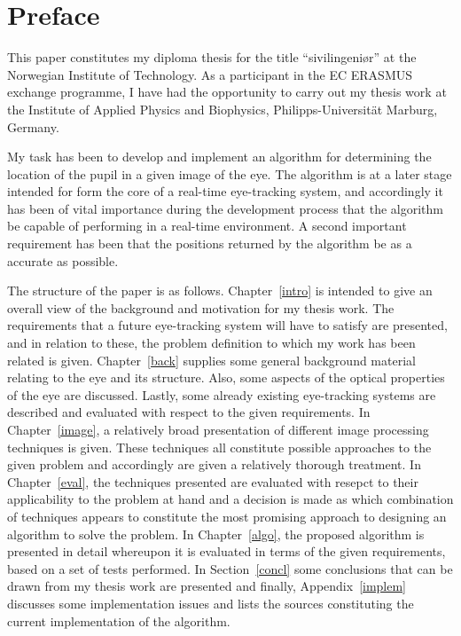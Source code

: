 
\cleardoublepage
\chapter*{Preface}
\label{preface}

This paper constitutes my diploma thesis for the title
``sivilingeni\o r'' at the Norwegian Institute of Technology.  As a
participant in the EC ERASMUS exchange programme, I have had the
opportunity to carry out my thesis work at the Institute of Applied
Physics and Biophysics, Philipps-Universit{\"a}t Marburg, Germany.

My task has been to develop and implement an algorithm for determining
the location of the pupil in a given image of the eye.  The algorithm
is at a later stage intended for form the core of a real-time
eye-tracking system, and accordingly it has been of vital importance
during the development process that the algorithm be capable of
performing in a real-time environment.  A second important requirement
has been that the positions returned by the algorithm be as a accurate
as possible.

The structure of the paper is as follows.  Chapter~\ref{intro} is
intended to give an overall view of the background and motivation for
my thesis work.  The requirements that a future eye-tracking system
will have to satisfy are presented, and in relation to these, the
problem definition to which my work has been related is given.
Chapter~\ref{back} supplies some general background material relating
to the eye and its structure.  Also, some aspects of the optical
properties of the eye are discussed.  Lastly, some already existing
eye-tracking systems are described and evaluated with respect to the
given requirements.  In Chapter~\ref{image}, a relatively broad
presentation of different image processing techniques is given.  These
techniques all constitute possible approaches to the given problem and
accordingly are given a relatively thorough treatment.  In
Chapter~\ref{eval}, the techniques presented are evaluated with
resepct to their applicability to the problem at hand and a decision
is made as which combination of techniques appears to constitute the
most promising approach to designing an algorithm to solve the
problem.  In Chapter~\ref{algo}, the proposed algorithm is presented
in detail whereupon it is evaluated in terms of the given
requirements, based on a set of tests performed.  In
Section~\ref{concl} some conclusions that can be drawn from my thesis
work are presented and finally, Appendix~\ref{implem} discusses some
implementation issues and lists the sources constituting the current
implementation of the algorithm.

